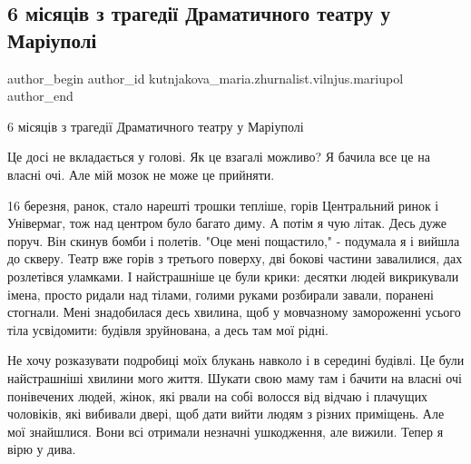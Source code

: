  
 
 
 
 

\subsection{6 місяців з трагедії Драматичного театру у Маріуполі}
\label{sec:16_09_2022.fb.kutnjakova_maria.zhurnalist.vilnjus.mariupol.1.6_misjaciv_tragedia_dramteatr}

\ifcmt
 author_begin
   author_id kutnjakova_maria.zhurnalist.vilnjus.mariupol
 author_end
\fi

6 місяців з трагедії Драматичного театру у Маріуполі

Це досі не вкладається у голові. Як це взагалі можливо? Я бачила все це на
власні очі. Але мій мозок не може це прийняти.

16 березня, ранок, стало нарешті трошки тепліше, горів Центральний ринок і
Універмаг, тож над центром було багато диму. А потім я чую літак. Десь дуже
поруч. Він скинув бомби і полетів. "Оце мені пощастило," - подумала я і вийшла
до скверу. Театр вже горів з третього поверху, дві бокові частини завалилися,
дах розлетівся уламками. І найстрашніше це були крики: десятки людей
викрикували імена, просто ридали над тілами, голими руками розбирали завали,
поранені стогнали. Мені знадобилася десь хвилина, щоб у мовчазному замороженні
усього тіла усвідомити: будівля зруйнована, а десь там мої рідні. 

Не хочу розказувати подробиці моїх блукань навколо і в середині будівлі. Це
були найстрашніші хвилини мого життя. Шукати свою маму там і бачити на власні
очі понівечених людей, жінок, які рвали на собі волосся від відчаю і плачущих
чоловіків, які вибивали двері, щоб дати вийти людям з різних приміщень. Але мої
знайшлися. Вони всі отримали незначні ушкодження, але вижили. Тепер я вірю у
дива. 


